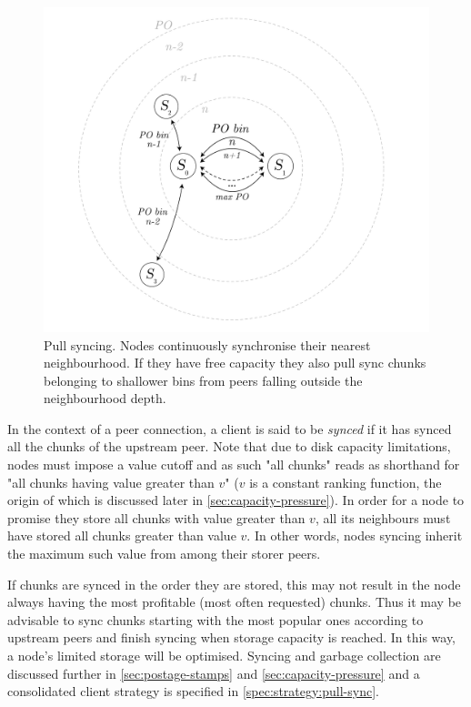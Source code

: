 \begin{figure}[htbp]
   \centering
   \includegraphics[width=\textwidth]{fig/pull-sync.pdf}
   \caption[Pull syncing \statusgreen]{Pull syncing. Nodes continuously synchronise their nearest neighbourhood. If they have free capacity they also pull sync chunks belonging to shallower bins from peers falling outside the neighbourhood depth.}
   \label{fig:pull-syncing}
\end{figure}

In the context of a peer connection, a client is said to be \emph{synced} if it has synced all the chunks of the upstream peer. Note that due to disk capacity limitations, nodes must impose a value cutoff and as such "all chunks" reads as shorthand for "all chunks having value greater than $v$" ($v$ is a constant ranking function, the origin of which is discussed later in \ref{sec:capacity-pressure}). In order for a node to promise they store all chunks with value greater than $v$, all its neighbours must have stored all chunks greater than value $v$. In other words, nodes syncing inherit the maximum such value from among their storer peers. 

If chunks are synced in the order they are stored, this may not result in the node always having the most profitable (most often requested) chunks. Thus it may be advisable to sync chunks starting with the most popular ones according to upstream peers and finish syncing when storage capacity is reached. In this way, a node's limited storage will be optimised. Syncing and garbage collection are discussed further in \ref{sec:postage-stamps} and \ref{sec:capacity-pressure} and a consolidated client strategy is specified in \ref{spec:strategy:pull-sync}.

